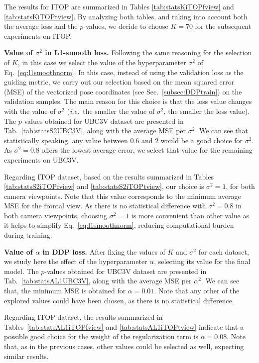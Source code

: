 \documentclass[review,12pt,3p]{elsarticle}
\def \ie{\textit{i.e.}}
\newcommand{\myparagraph}[1]{\noindent \textbf{#1}}
\begin{document}
The results for ITOP are summarized in Tables \ref{tab:statsKiTOPfview} and \ref{tab:statsKiTOPtview}. By analyzing both tables, and taking into account both the average loss and the $p$-values, we decide to choose $K=70$ for the subsequent experiments on ITOP.

\myparagraph{Value of $\sigma^2$ in L1-smooth loss.}
%
Following the same reasoning for the selection of $K$, in this case we select the value of the hyperparameter $\sigma^2$ of Eq.~\ref{eq:l1smoothnorm}. 
In this case, instead of using the validation loss as the guiding metric, we carry out our selection based on the mean squared error (MSE) of the vectorized pose coordinates (see Sec.~\ref{subsec:DDPtrain}) on the validation samples. The main reason for this choice is that the loss value changes with the value of $\sigma^2$ (\ie~the smaller the value of $\sigma^2$, the smaller the loss value).
The $p$-values obtained for UBC3V dataset are presented in Tab.~\ref{tab:statsS2UBC3V}, along with the average MSE per $\sigma^2$. We can see that statistically speaking, any value between $0.6$ and $2$ would be a good choice for $\sigma^2$. As $\sigma^2=0.8$ offers the lowest average error, we select that value for the remaining experiments on UBC3V.


Regarding ITOP dataset, based on the results summarized in Tables \ref{tab:statsS2iTOPfview} and \ref{tab:statsS2iTOPtview}, our choice is $\sigma^2=1$, for both camera viewpoints. Note that this value corresponds to the minimum average MSE for the frontal view. As there is no statistical difference with $\sigma^2=0.8$ in both camera viewpoints, choosing $\sigma^2=1$ is more convenient than other value as it helps to simplify Eq.~\ref{eq:l1smoothnorm}, reducing computational burden during training.


\myparagraph{Value of $\alpha$ in DDP loss.}
After fixing the values of $K$ and $\sigma^2$ for each dataset, we study here the effect of the hyperparameter $\alpha$, selecting its value for the final model.
The $p$-values obtained for UBC3V dataset are presented in Tab.~\ref{tab:statsAL1UBC3V}, along with the average MSE per $\alpha^2$. We can see that, the minimum MSE is obtained for $\alpha=0.01$. Note that any other of the explored values could have been chosen, as there is no statistical difference.

Regarding ITOP dataset, the results summarized in Tables~\ref{tab:statsAL1iTOPfview} and \ref{tab:statsAL1iTOPtview} indicate that a possible good choice for the weight of the regularization term is $\alpha = 0.08$. Note that, as in the previous cases, other values could be selected as well, expecting similar results.
\end{document}
